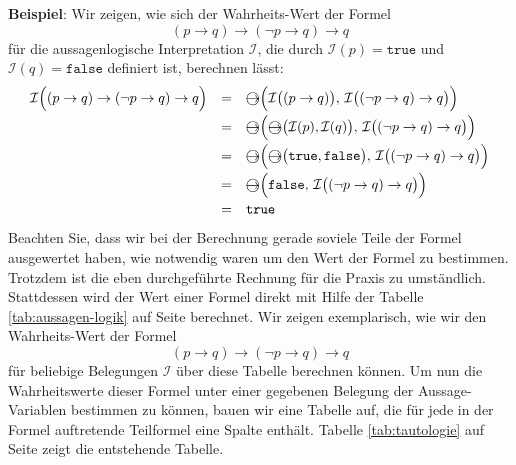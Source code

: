 \noindent
\textbf{Beispiel}: Wir zeigen, wie sich der Wahrheits-Wert der Formel
$$  (p \rightarrow q) \rightarrow (\neg p \rightarrow q) \rightarrow q $$
f\"{u}r die aussagenlogische Interpretation $\mathcal{I}$, die durch 
$\mathcal{I}(p) = \mathtt{true}$ und $\mathcal{I}(q) = \mathtt{false}$ definiert ist,
berechnen l\"{a}sst: 
\[
  \begin{array}{lcl}
   \mathcal{I}\Bigl( (p \rightarrow q) \rightarrow (\neg p \rightarrow q) \rightarrow q  \Bigr) 
   & = &  \circright\Bigl( \mathcal{I}\bigl( (p \rightarrow q) \bigr),\, \mathcal{I}\bigl((\neg p \rightarrow q) \rightarrow q\bigr) \Bigr) \\[0.2cm]
   & = & \circright\Bigl( \circright\bigl( \mathcal{I}(p), \mathcal{I}(q) \bigr),\, \mathcal{I}\bigl((\neg p \rightarrow q) \rightarrow q\bigr) \Bigr) \\[0.2cm]
   & = & \circright\Bigl( \circright\bigl( \mathtt{true}, \mathtt{false} \bigr),\, \mathcal{I}\bigl((\neg p \rightarrow q) \rightarrow q\bigr) \Bigr) \\[0.2cm]
   & = & \circright\Bigl( \mathtt{false}, \, \mathcal{I}\bigl((\neg p \rightarrow q) \rightarrow q\bigr) \Bigr) \\[0.2cm]
   & = & \mathtt{true} \\
 \end{array}
\]
Beachten Sie, dass wir bei der Berechnung gerade soviele Teile der Formel ausgewertet
haben, wie notwendig waren um den Wert der Formel zu bestimmen.  Trotzdem ist die
eben durchgef\"{u}hrte Rechnung f\"{u}r die Praxis zu umst\"{a}ndlich.  Stattdessen wird der Wert
einer Formel direkt mit Hilfe der Tabelle \ref{tab:aussagen-logik} auf Seite
\pageref{tab:aussagen-logik} berechnet.  Wir zeigen exemplarisch, wie wir den
Wahrheits-Wert der Formel
$$  (p \rightarrow q) \rightarrow (\neg p \rightarrow q) \rightarrow q $$
f\"{u}r beliebige Belegungen $\mathcal{I}$ \"{u}ber diese Tabelle berechnen k\"{o}nnen.
 Um nun die Wahrheitswerte 
dieser Formel unter einer gegebenen Belegung der Aussage-Variablen bestimmen zu k\"{o}nnen,
 bauen wir eine  Tabelle auf, die f\"{u}r jede in der Formel
auftretende Teilformel eine Spalte enth\"{a}lt.  Tabelle \ref{tab:tautologie} auf Seite
\pageref{tab:tautologie} zeigt die entstehende Tabelle.
